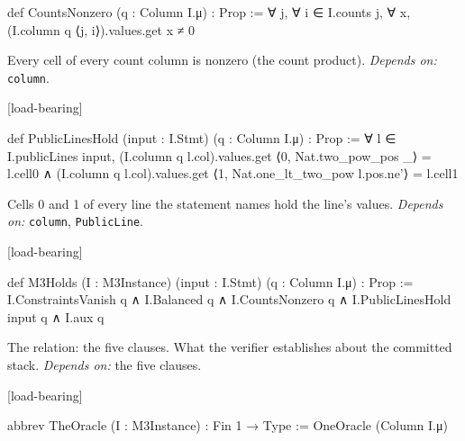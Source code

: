 \begin{leancode}
def CountsNonzero (q : Column I.μ) : Prop :=
  ∀ j, ∀ i ∈ I.counts j, ∀ x, (I.column q ⟨j, i⟩).values.get x ≠ 0
\end{leancode}


Every cell of every count column is nonzero (the count product). \emph{Depends on:} \texttt{column}.

\par\medskip\noindent\textbf{}\hfill\textsf{\small [load-bearing]}\par\nopagebreak

\begin{leancode}
def PublicLinesHold (input : I.Stmt) (q : Column I.μ) : Prop :=
  ∀ l ∈ I.publicLines input,
    (I.column q l.col).values.get ⟨0, Nat.two_pow_pos _⟩ = l.cell0 ∧
      (I.column q l.col).values.get ⟨1, Nat.one_lt_two_pow l.pos.ne'⟩ = l.cell1
\end{leancode}


Cells 0 and 1 of every line the statement names hold the line's values. \emph{Depends on:} \texttt{column}, \texttt{PublicLine}.

\par\medskip\noindent\textbf{}\hfill\textsf{\small [load-bearing]}\par\nopagebreak

\begin{leancode}
def M3Holds (I : M3Instance) (input : I.Stmt) (q : Column I.μ) : Prop :=
  I.ConstraintsVanish q ∧ I.Balanced q ∧ I.CountsNonzero q ∧ I.PublicLinesHold input q ∧ I.aux q
\end{leancode}


The relation: the five clauses. What the verifier establishes about the committed stack. \emph{Depends on:} the five clauses.

\par\medskip\noindent\textbf{}\hfill\textsf{\small [load-bearing]}\par\nopagebreak

\begin{leancode}
abbrev TheOracle (I : M3Instance) : Fin 1 → Type := OneOracle (Column I.μ)
\end{leancode}

